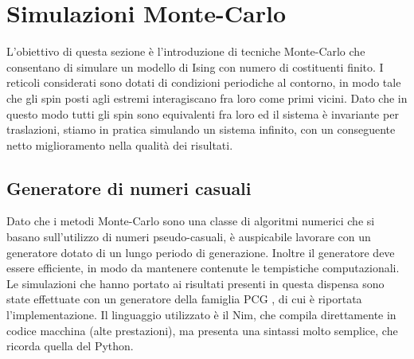 \section{Simulazioni Monte-Carlo}

L'obiettivo di questa sezione è l'introduzione di tecniche Monte-Carlo che consentano di simulare un modello di Ising con 
numero di costituenti finito. I reticoli considerati sono dotati di condizioni periodiche al contorno, in modo tale che gli spin 
posti agli estremi interagiscano fra loro come primi vicini. Dato che in questo modo tutti gli spin sono equivalenti fra loro ed 
il sistema è invariante per traslazioni, stiamo in pratica simulando un sistema infinito, con un conseguente netto miglioramento 
nella qualità dei risultati. 





\subsection{Generatore di numeri casuali}

Dato che i metodi Monte-Carlo sono una classe di algoritmi numerici che si basano sull'utilizzo di numeri pseudo-casuali, è auspicabile lavorare 
con un generatore dotato di un lungo periodo di generazione. Inoltre il generatore deve essere efficiente, in modo da mantenere contenute le 
tempistiche computazionali. Le simulazioni che hanno portato ai risultati presenti in questa dispensa sono state effettuate con un 
generatore della famiglia PCG \cite{pcg2014}, di cui è riportata l'implementazione. Il linguaggio utilizzato è il Nim, che compila 
direttamente in codice macchina (alte prestazioni), ma presenta una sintassi molto semplice, che ricorda quella del Python.


